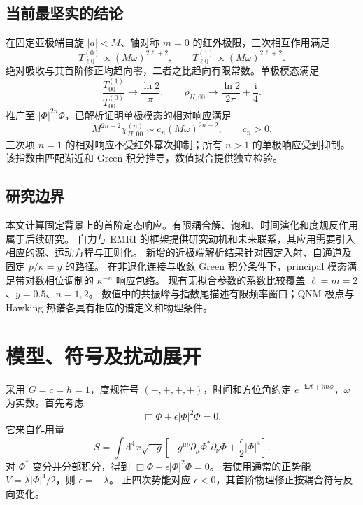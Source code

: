 \documentclass[UTF8,fontset=fandol,11pt,a4paper]{ctexart}
\newcommand{\ii}{\mathrm{i}}
\newcommand{\dd}{\mathrm{d}}
\numberwithin{equation}{section}
\begin{document}
\subsection{当前最坚实的结论}
在固定亚极端自旋 $|a|<M$、轴对称 $m=0$ 的红外极限，三次相互作用满足
\begin{equation}
T^{(0)}_{\ell0}\propto(M\omega)^{2\ell+2},\qquad
T^{(1)}_{\ell0}\propto(M\omega)^{2\ell+2}.
\end{equation}
绝对吸收与其首阶修正均趋向零，二者之比趋向有限常数。单极模态满足
\begin{equation}
\frac{T^{(1)}_{00}}{T^{(0)}_{00}}\longrightarrow\frac{\ln2}{\pi},\qquad
\rho_{H,00}\longrightarrow\frac{\ln2}{2\pi}+\frac{\ii}{4}.
\end{equation}
推广至 $|\Phi|^{2n}\Phi$，已解析证明单极模态的相对响应满足
\begin{equation}
M^{2n-2}\chi^{(n)}_{H,00}\sim c_n(M\omega)^{2n-2},\qquad c_n>0.
\end{equation}
三次项 $n=1$ 的相对响应不受红外幂次抑制；所有 $n>1$ 的单极响应受到抑制。
该指数由匹配渐近和 Green 积分推导，数值拟合提供独立检验。

\subsection{研究边界}
本文计算固定背景上的首阶定态响应。有限耦合解、饱和、时间演化和度规反作用属于后续研究。
自力与 EMRI 的框架\cite{BarackPound2019,PoundWardell2021}提供研究动机和未来联系，其应用需要引入相应的源、运动方程与正则化。
新增的近极端解析结果针对固定入射、自通道及固定 $p/\kappa=y$ 的路径。
在非退化连接与收敛 Green 积分条件下，principal 模态满足带对数相位调制的 $\kappa^{-n}$ 响应包络。
现有无拟合参数的系数比较覆盖 $\ell=m=2$、$y=0.5$、$n=1,2$。
数值中的共振峰与指数尾描述有限频率窗口；QNM 极点与 Hawking 热谱各具有相应的谱定义和物理条件。

\section{模型、符号及扰动展开}
采用 $G=c=\hbar=1$，度规符号 $(-,+,+,+)$，时间和方位角约定
$e^{-\ii\omega t+\ii m\phi}$，$\omega$ 为实数。首先考虑
\begin{equation}\Box\Phi+\epsilon|\Phi|^2\Phi=0.\label{model}\end{equation}
它来自作用量
\begin{equation}
S=\int\dd^4x\sqrt{-g}\left[-g^{\mu\nu}\partial_\mu\Phi^*\partial_\nu\Phi
+\frac{\epsilon}{2}|\Phi|^4\right].
\end{equation}
对 $\Phi^*$ 变分并分部积分，得到 $\Box\Phi+\epsilon|\Phi|^2\Phi=0$。
若使用通常的正势能 $V=\lambda|\Phi|^4/2$，则 $\epsilon=-\lambda$。
正四次势能对应 $\epsilon<0$，其首阶物理修正按耦合符号反向变化。
\end{document}
